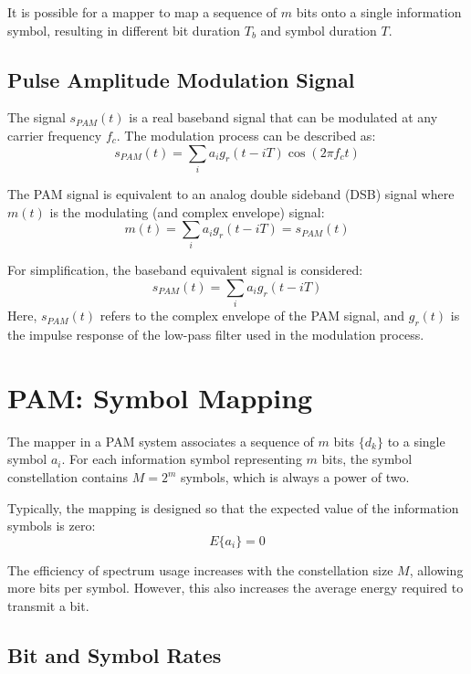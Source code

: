 It is possible for a mapper to map a sequence of \( m \) bits onto a single information symbol, resulting in different bit duration \( T_b \) and symbol duration \( T \).

\subsection*{Pulse Amplitude Modulation Signal}

The signal \( s_{PAM}(t) \) is a real baseband signal that can be modulated at any carrier frequency \( f_c \). The modulation process can be described as:
\[ s_{PAM}(t) = \sum_i a_i g_r(t - iT) \cos(2\pi f_c t) \]

The PAM signal is equivalent to an analog double sideband (DSB) signal where \( m(t) \) is the modulating (and complex envelope) signal:
\[ m(t) = \sum_i a_i g_r(t - iT) = s_{PAM}(t) \]

For simplification, the baseband equivalent signal is considered:
\[ s_{PAM}(t) = \sum_i a_i g_r(t - iT) \]
Here, \( s_{PAM}(t) \) refers to the complex envelope of the PAM signal, and \( g_r(t) \) is the impulse response of the low-pass filter used in the modulation process.

\section*{PAM: Symbol Mapping}

The mapper in a PAM system associates a sequence of \( m \) bits \( \{d_k\} \) to a single symbol \( a_i \). For each information symbol representing \( m \) bits, the symbol constellation contains \( M = 2^m \) symbols, which is always a power of two.

Typically, the mapping is designed so that the expected value of the information symbols is zero:
\[ E\{a_i\} = 0 \]

The efficiency of spectrum usage increases with the constellation size \( M \), allowing more bits per symbol. However, this also increases the average energy required to transmit a bit.

\subsection*{Bit and Symbol Rates}

